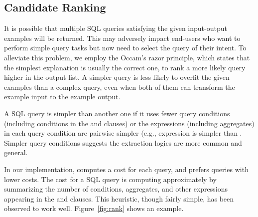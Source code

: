 \subsection{Candidate Ranking}
\label{sec:ranking}


It is possible that multiple SQL queries satisfying
the given input-output examples will be returned.
This may adversely impact end-users who want to
perform simple query tasks but now need
to select the query of their intent.
To alleviate this problem, we employ
the Occam's razor principle, which states that the
simplest explanation is usually the correct one, to
rank a more likely query higher in the output list.
A simpler query is less likely to overfit the given examples
than a complex query, even when both of them
can transform the example input to the example output.


A SQL query is simpler than another one if it uses
fewer query conditions (including conditions in the 
and  clauses) or the expressions (including
aggregates) in each query condition are pairwise simpler
(e.g., expression  is simpler than
.
Simpler query conditions suggests the extraction logics
are more common and general.

In our implementation, \ourtool computes a cost for each
query, and prefers queries with lower costs. The cost
for a SQL query is computing approximately by summarizing
the number of conditions, aggregates,
and other expressions
appearing in the  and  clauses.
This heuristic, though fairly simple, has been observed
to work well.
Figure~\ref{fig:rank} shows an example.


